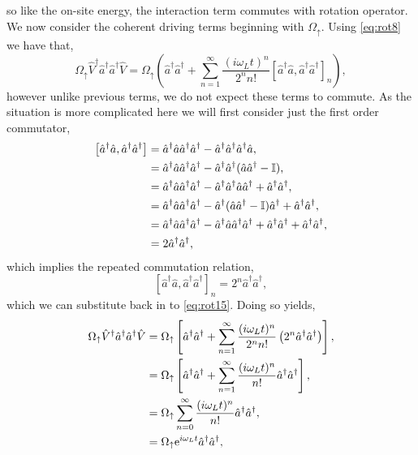 so like the on-site energy, the interaction term commutes with rotation operator. We now consider the coherent driving terms beginning with \(\Omega_{\uparrow}\). Using \cref{eq:rot8} we have that,
\begin{equation}
	\Omega_{\uparrow}\hat{V}^{\dagger}\hat{a}^{\dagger}\hat{a}^{\dagger}\hat{V} = \Omega_{\uparrow}\left(\hat{a}^{\dagger}\hat{a}^{\dagger} + \sum_{n=1}^{\infty} \frac{(i\omega_{L}t)^{n}}{2^{n}n!}[\hat{a}^{\dagger}\hat{a}, \hat{a}^{\dagger}\hat{a}^{\dagger}]_{n}\right),
	\label{eq:rot15}
\end{equation}
however unlike previous terms, we do not expect these terms to commute. As the situation is more complicated here we will first consider just the first order commutator,
\begin{align}
	\left[\hat{a}^{\dagger}\hat{a}, \hat{a}^{\dagger}\hat{a}^{\dagger}\right] &= \hat{a}^{\dagger}\hat{a}\hat{a}^{\dagger}\hat{a}^{\dagger} - \hat{a}^{\dagger}\hat{a}^{\dagger}\hat{a}^{\dagger}\hat{a}, \notag \\
	&=  \hat{a}^{\dagger}\hat{a}\hat{a}^{\dagger}\hat{a}^{\dagger} - \hat{a}^{\dagger}\hat{a}^{\dagger}(\hat{a}\hat{a}^{\dagger} - \mathbb{I}), \notag \\
	&= \hat{a}^{\dagger}\hat{a}\hat{a}^{\dagger}\hat{a}^{\dagger} - \hat{a}^{\dagger}\hat{a}^{\dagger}\hat{a}\hat{a}^{\dagger} + \hat{a}^{\dagger}\hat{a}^{\dagger}, \notag \\
	&= \hat{a}^{\dagger}\hat{a}\hat{a}^{\dagger}\hat{a}^{\dagger} - \hat{a}^{\dagger}(\hat{a}\hat{a}^{\dagger} - \mathbb{I})\hat{a}^{\dagger} + \hat{a}^{\dagger}\hat{a}^{\dagger}, \notag \\
	&= \hat{a}^{\dagger}\hat{a}\hat{a}^{\dagger}\hat{a}^{\dagger} - \hat{a}^{\dagger}\hat{a}\hat{a}^{\dagger}\hat{a}^{\dagger} + \hat{a}^{\dagger}\hat{a}^{\dagger} + \hat{a}^{\dagger}\hat{a}^{\dagger}, \notag \\
	&= 2\hat{a}^{\dagger}\hat{a}^{\dagger},
	\label{eq:rot16}
\end{align}
which implies the repeated commutation relation,
\begin{equation}
	\left[\hat{a}^{\dagger}\hat{a}, \hat{a}^{\dagger}\hat{a}^{\dagger} \right]_{n} = 2^{n}\hat{a}^{\dagger}\hat{a}^{\dagger},
	\label{eq:rot17}
\end{equation}
which we can substitute back in to \cref{eq:rot15}. Doing so yields,
\begin{align}
	\Omega_{\uparrow}\hat{V}^{\dagger}\hat{a}^{\dagger}\hat{a}^{\dagger}\hat{V} &= \Omega_{\uparrow}\left[\hat{a}^{\dagger}\hat{a}^{\dagger} + \sum_{n=1}^{\infty} \frac{(i\omega_{L}t)^{n}}{2^{n}n!}\left(2^{n}\hat{a}^{\dagger}\hat{a}^{\dagger}\right)\right], \notag \\
	&= \Omega_{\uparrow}\left[\hat{a}^{\dagger}\hat{a}^{\dagger} + \sum_{n=1}^{\infty} \frac{(i\omega_{L}t)^{n}}{n!} \hat{a}^{\dagger}\hat{a}^{\dagger}\right], \notag \\
	&= \Omega_{\uparrow}\sum_{n=0}^{\infty} \frac{(i\omega_{L}t)^{n}}{n!} \hat{a}^{\dagger}\hat{a}^{\dagger}, \notag \\
	&= \Omega_{\uparrow}\mathrm{e}^{i\omega_{L}t}\hat{a}^{\dagger}\hat{a}^{\dagger},
	\label{eq:rot18}
\end{align}
